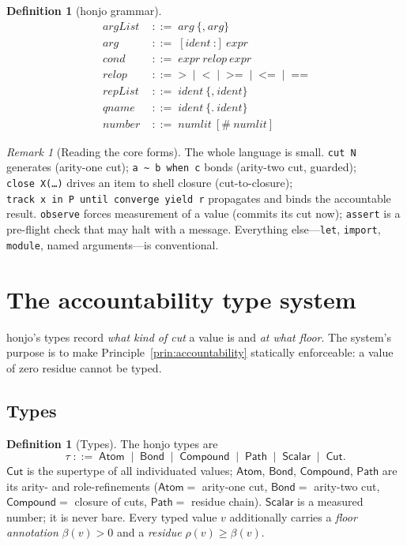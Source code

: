 \documentclass[11pt,a4paper]{article}
\theoremstyle{thmstyle}
\theoremstyle{definition}
\newtheorem{definition}[theorem]{Definition}
\theoremstyle{remark}
\newtheorem{remark}[theorem]{Remark}
\newcommand{\flo}{\beta}
\newcommand{\res}{\rho}
\newcommand{\bnf}{\;::=\;}
\newcommand{\alt}{\;\mid\;}
\newcommand{\hj}[1]{\texttt{#1}}
\begin{document}
\begin{definition}[honjo grammar]
\begin{align*}
\textit{argList} &\bnf \textit{arg}\ \{\hj{,}\ \textit{arg}\} \\
\textit{arg} &\bnf [\textit{ident}\ \hj{:}]\ \textit{expr} \\[2pt]
\textit{cond} &\bnf \textit{expr}\ \textit{relop}\ \textit{expr} \\
\textit{relop} &\bnf \hj{>} \alt \hj{<} \alt \hj{>=} \alt \hj{<=}
   \alt \hj{==} \\[2pt]
\textit{repList} &\bnf \textit{ident}\ \{\hj{,}\ \textit{ident}\} \\
\textit{qname} &\bnf \textit{ident}\ \{\hj{.}\ \textit{ident}\} \\
\textit{number} &\bnf \textit{numlit}\ [\hj{\#}\ \textit{numlit}]
\end{align*}
\end{definition}

\begin{remark}[Reading the core forms]
\label{rem:core-forms}
The whole language is small. \hj{cut\ N} generates (arity-one cut);
\hj{a\ \~{}\ b\ when\ c} bonds (arity-two cut, guarded);
\hj{close\ X(\ldots)} drives an item to shell closure (cut-to-closure);
\hj{track\ x\ in\ P\ until\ converge\ yield\ r} propagates and binds the
accountable result. \hj{observe} forces measurement of a value (commits
its cut now); \hj{assert} is a pre-flight check that may halt with a
message. Everything else---\hj{let}, \hj{import}, \hj{module}, named
arguments---is conventional.
\end{remark}

\section{The accountability type system}
\label{sec:types}

honjo's types record \emph{what kind of cut} a value is and \emph{at what
floor}. The system's purpose is to make Principle~\ref{prin:accountability}
statically enforceable: a value of zero residue cannot be typed.

\subsection{Types}

\begin{definition}[Types]
\label{def:types}
The honjo types are
\[
\tau \bnf \mathsf{Atom} \alt \mathsf{Bond} \alt \mathsf{Compound}
   \alt \mathsf{Path} \alt \mathsf{Scalar} \alt \mathsf{Cut}.
\]
$\mathsf{Cut}$ is the supertype of all individuated values; $\mathsf{Atom}$,
$\mathsf{Bond}$, $\mathsf{Compound}$, $\mathsf{Path}$ are its arity- and
role-refinements ($\mathsf{Atom}=$ arity-one cut, $\mathsf{Bond}=$
arity-two cut, $\mathsf{Compound}=$ closure of cuts, $\mathsf{Path}=$
residue chain). $\mathsf{Scalar}$ is a measured number; it is never bare.
Every typed value $v$ additionally carries a \emph{floor annotation}
$\flo(v)>0$ and a \emph{residue} $\res(v)\ge\flo(v)$.
\end{definition}
\end{document}
